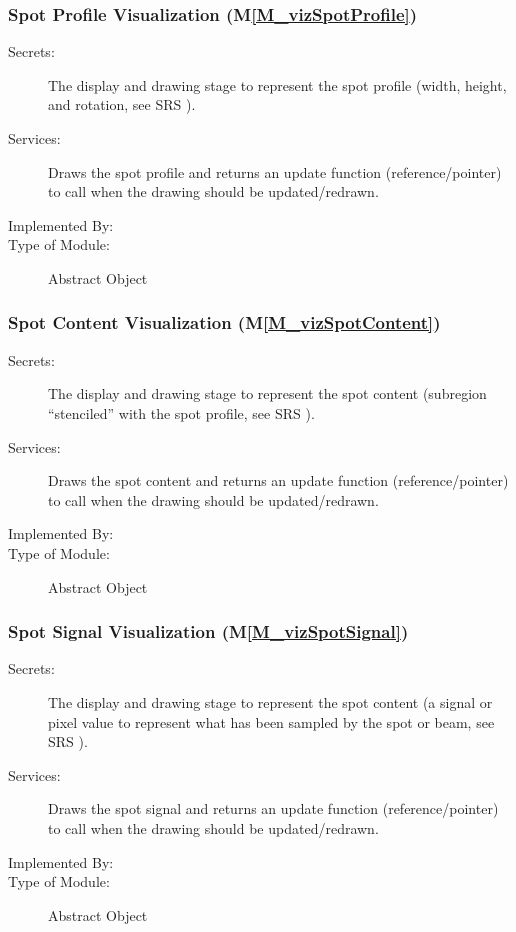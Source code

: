 \documentclass[12pt, titlepage]{article}
\newcommand{\mref}[1]{M\ref{#1}}
\begin{document}
\subsubsection{Spot Profile Visualization (\mref{M_vizSpotProfile})}
\begin{description}
\item[Secrets:] The display and drawing stage to represent the
  spot profile (width, height, and rotation, see SRS \cite{SRS}).
\item[Services:] Draws the spot profile and returns an update function (reference/pointer)
  to call when the drawing should be updated/redrawn.
\item[Implemented By:] \progname{}
\item[Type of Module:] Abstract Object
\end{description}


\subsubsection{Spot Content Visualization (\mref{M_vizSpotContent})}
\begin{description}
\item[Secrets:] The display and drawing stage to represent the
  spot content (subregion ``stenciled'' with the spot profile, see SRS \cite{SRS}).
\item[Services:] Draws the spot content and returns an update function (reference/pointer)
  to call when the drawing should be updated/redrawn.
\item[Implemented By:] \progname{}
\item[Type of Module:] Abstract Object
\end{description}


\subsubsection{Spot Signal Visualization (\mref{M_vizSpotSignal})}
\begin{description}
\item[Secrets:] The display and drawing stage to represent the
  spot content (a signal or pixel value to represent what has been sampled by
  the spot or beam, see SRS \cite{SRS}).
\item[Services:] Draws the spot signal and returns an update function (reference/pointer)
  to call when the drawing should be updated/redrawn.
\item[Implemented By:] \progname{}
\item[Type of Module:] Abstract Object
\end{description}
\end{document}
